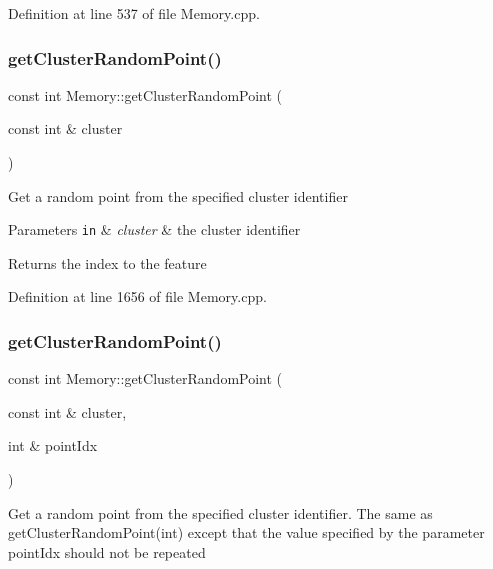 Definition at line 537 of file Memory.\+cpp.

\mbox{\label{class_memory_a54eea5f00668704da0dac9fb91f4773e}} 
\subsubsection{\texorpdfstring{get\+Cluster\+Random\+Point()}{getClusterRandomPoint()}\hspace{0.1cm}{\footnotesize\ttfamily [1/2]}}
{\footnotesize\ttfamily const int Memory\+::get\+Cluster\+Random\+Point (\begin{DoxyParamCaption}\item[{const int \&}]{cluster }\end{DoxyParamCaption})}

Get a random point from the specified cluster identifier


\begin{DoxyParams}[1]{Parameters}
\mbox{\tt in}  & {\em cluster} & the cluster identifier\\
\hline
\end{DoxyParams}
Returns the index to the feature 

Definition at line 1656 of file Memory.\+cpp.

\mbox{\label{class_memory_a3a327af9dcb4c8f6213833b880564620}} 
\subsubsection{\texorpdfstring{get\+Cluster\+Random\+Point()}{getClusterRandomPoint()}\hspace{0.1cm}{\footnotesize\ttfamily [2/2]}}
{\footnotesize\ttfamily const int Memory\+::get\+Cluster\+Random\+Point (\begin{DoxyParamCaption}\item[{const int \&}]{cluster,  }\item[{int \&}]{point\+Idx }\end{DoxyParamCaption})}

Get a random point from the specified cluster identifier. The same as get\+Cluster\+Random\+Point(int) except that the value specified by the parameter point\+Idx should not be repeated


